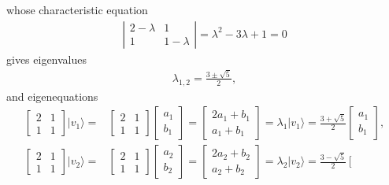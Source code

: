 \documentclass[en]{sol-man}
\begin{document}
\begin{sol}
    whose characteristic equation
    \begin{align}
        \left\lvert\begin{matrix}
            2-\lambda&1\\
            1&1-\lambda
        \end{matrix}\right\rvert=\lambda^2-3\lambda+1=0
    \end{align}
    gives eigenvalues
    \begin{align}
        \lambda_{1,2}=\frac{3\pm\sqrt{5}}{2},
    \end{align}
    and eigenequations
    \begin{align}
        \left[\begin{matrix}
            2&1\\
            1&1
        \end{matrix}\right]\lvert v_1\rangle=&\left[\begin{matrix}
            2&1\\
            1&1
        \end{matrix}\right]\left[\begin{matrix}
            a_1\\
            b_1
        \end{matrix}\right]=\left[\begin{matrix}
            2a_1+b_1\\
            a_1+b_1
        \end{matrix}\right]=\lambda_1\lvert v_1\rangle=\frac{3+\sqrt{5}}{2}\left[\begin{matrix}
            a_1\\
            b_1
        \end{matrix}\right],\\
        \left[\begin{matrix}
            2&1\\
            1&1
        \end{matrix}\right]\lvert v_2\rangle=&\left[\begin{matrix}
            2&1\\
            1&1
        \end{matrix}\right]\left[\begin{matrix}
            a_2\\
            b_2
        \end{matrix}\right]=\left[\begin{matrix}
            2a_2+b_2\\
            a_2+b_2
        \end{matrix}\right]=\lambda_2\lvert v_2\rangle=\frac{3-\sqrt{5}}{2}\left[\begin{matrix}

\end{matrix}
\end{align}
\end{sol}
\end{document}
